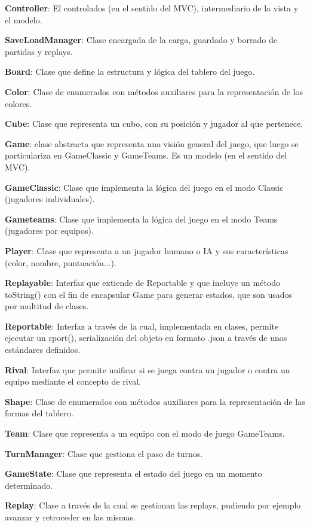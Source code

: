 \documentclass[12pt,a4paper,openright]{book}
\theoremstyle{break}
\begin{document}
\textbf{Controller}: El controlados (en el sentido del MVC), intermediario de la vista y el modelo.

\textbf{SaveLoadManager}: Clase encargada de la carga, guardado y borrado de partidas y replays.

\textbf{Board}: Clase que define la estructura y lógica del tablero del juego.

\textbf{Color}: Clase de enumerados con métodos auxiliares para la representación de los colores.

\textbf{Cube}: Clase que representa un cubo, con su posición y jugador al que pertenece.

\textbf{Game}: clase abstracta que representa una visión general del juego, que luego se particulariza en GameClassic y GameTeams. Es un modelo (en el sentido del MVC).

\textbf{GameClassic}: Clase que implementa la lógica del juego en el modo Classic (jugadores individuales).

\textbf{Gameteams}: Clase que implementa la lógica del juego en el modo Teams (jugadores por equipos).

\textbf{Player}: Clase que representa a un jugador humano o IA y sus características (color, nombre, puntuación...).

\textbf{Replayable}: Interfaz que extiende de Reportable y que incluye un método toString() con el fin de encapsular Game para generar estados, que son usados por multitud de clases.

\textbf{Reportable}: Interfaz a través de la cual, implementada en clases, permite ejecutar un rport(), serialización del objeto en formato .json a través de unos estándares definidos.

\textbf{Rival}: Interfaz que permite unificar si se juega contra un jugador o contra un equipo mediante el concepto de rival.

\textbf{Shape}: Clase de enumerados con métodos auxiliares para la representación de las formas del tablero.

\textbf{Team}: Clase que representa a un equipo con el modo de juego GameTeams.

\textbf{TurnManager}: Clase que gestiona el paso de turnos.

\textbf{GameState}: Clase que representa el estado del juego en un momento determinado.

\textbf{Replay}: Clase a través de la cual se gestionan las replays, pudiendo por ejemplo avanzar y retroceder en las mismas.
\end{document}
